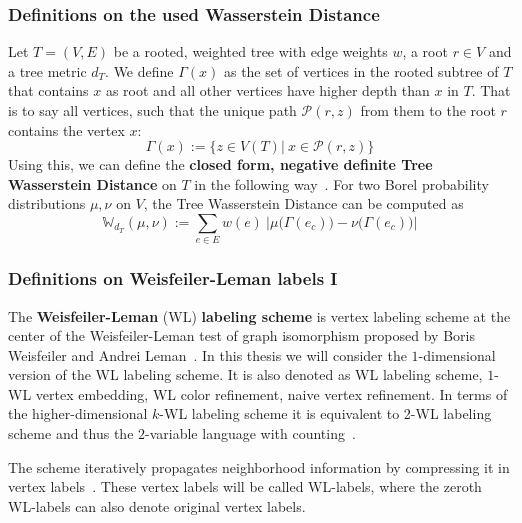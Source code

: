 \begin{frame}[allowframebreaks=0.9] \frametitle{Definitions on the used Wasserstein Distance}
	Let $T=(V, E)$ be a rooted, weighted tree with edge weights $w$, a root $r\in V$ and a tree metric $d_T$.
	We define $\Gamma(x)$ as the set of vertices in the rooted subtree of $T$ that contains $x$ as root and all other vertices have higher depth than $x$ in $T$. 
	That is to say all vertices, such that the unique path $\mathcal{P}(r, z)$ from them to the root $r$ contains the vertex $x$:
	\[ \Gamma(x) := \{ z\in V(T)|\ x\in \mathcal{P}(r, z) \} \]
	Using this, we can define the \textbf{closed form, negative definite Tree Wasserstein Distance} on $T$ in the following way~\cite{2019_Le_NIPS}.%
	For two Borel probability distributions $\mu, \nu$ on $V$, the Tree Wasserstein Distance can be computed as
	\[ \mathbb{W}_{d_T}(\mu, \nu) := \sum_{e\in E} w(e) \ \Big|\mu \big( \Gamma(e_c) \big) - \nu \big( \Gamma(e_c) \big) \Big| \]
\end{frame}

\begin{frame} \frametitle{Definitions on Weisfeiler-Leman labels I}
	The \textbf{Weisfeiler-Leman} (WL) \textbf{labeling scheme} is vertex labeling scheme at the center of the Weisfeiler-Leman test of graph isomorphism proposed by Boris Weisfeiler and Andrei Leman~\cite{1968_Weisfeiler_CONF}.
	In this thesis we will consider the $1$-dimensional version of the WL labeling scheme. 
	It is also denoted as WL labeling scheme, $1$-WL vertex embedding, WL color refinement, naive vertex refinement.
	In terms of the higher-dimensional $k$-WL labeling scheme it is equivalent to 2-WL labeling scheme and thus the $2$-variable language with counting~\cite{2011_Shervashidze_JMLR, 2019_Xu_CONF, 1992_Cai_IEEE}. 
	
	The scheme iteratively propagates neighborhood information by compressing it in vertex labels~\cite{1968_Weisfeiler_CONF}.
	These vertex labels will be called WL-labels, where the zeroth WL-labels can also denote original vertex labels.
\end{frame}

